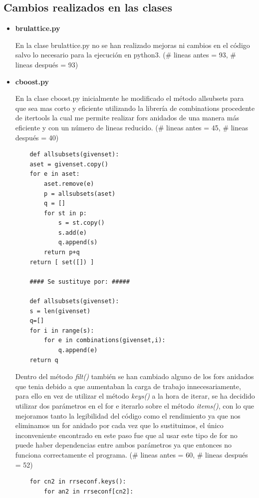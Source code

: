 \documentclass{cosas/tfg_domingo}
\begin{document}
\subsection{Cambios realizados en las clases}

\begin{itemize}

\item \textbf{brulattice.py}

En la clase brulattice.py no se han realizado mejoras ni cambios en el código salvo lo necesario para la ejecución en python3. (\# lineas antes = 93, \# lineas después = 93)

\item \textbf{cboost.py}

En la clase cboost.py inicialmente he modificado el método allsubsets para que sea mas corto y eficiente utilizando la librería de combinations procedente de itertools la cual me permite realizar fors anidados de una manera más eficiente y con un número de lineas reducido. (\# lineas antes = 45, \# lineas después = 40)

\begin{verbatim}
    def allsubsets(givenset):
    aset = givenset.copy()
    for e in aset:
        aset.remove(e)
        p = allsubsets(aset)
        q = []
        for st in p:
            s = st.copy()
            s.add(e)
            q.append(s)
        return p+q
    return [ set([]) ]
    
    #### Se sustituye por: #####
    
    def allsubsets(givenset):
    s = len(givenset)
    q=[]
    for i in range(s):
        for e in combinations(givenset,i):
            q.append(e)
    return q
\end{verbatim}

Dentro del método \textit{filt()} también se han cambiado alguno de los fors anidados que tenia debido a que aumentaban la carga de trabajo innecesariamente, para ello en vez de utilizar el método \textit{keys()} a la hora de iterar, se ha decidido utilizar dos parámetros en el for e iterarlo sobre el método \textit{items()}, con lo que mejoramos tanto la legibilidad del código como el rendimiento ya que nos eliminamos un for anidado por cada vez que lo sustituimos, el único inconveniente encontrado en este paso fue que al usar este tipo de for no puede haber dependencias entre ambos parámetros ya que entonces no funciona correctamente el programa. (\# lineas antes = 60, \# lineas después = 52)

\begin{verbatim}
    for cn2 in rrseconf.keys():
        for an2 in rrseconf[cn2]:
        

\end{verbatim}
\end{itemize}
\end{document}
